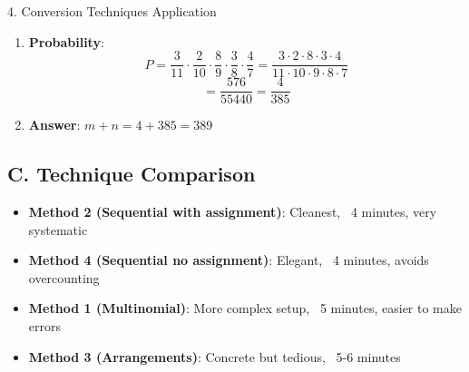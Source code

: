 \documentclass[12pt]{article}
\begin{document}
\begin{conversionbox}{4. Conversion Techniques Application}
\begin{enumerate}
    \item \textbf{Probability}:
    \[P = \frac{3}{11} \cdot \frac{2}{10} \cdot \frac{8}{9} \cdot \frac{3}{8} \cdot \frac{4}{7} = \frac{3 \cdot 2 \cdot 8 \cdot 3 \cdot 4}{11 \cdot 10 \cdot 9 \cdot 8 \cdot 7}\]
    \[= \frac{576}{55440} = \frac{4}{385}\]
    
    \item \textbf{Answer}: $m + n = 4 + 385 = 389$
\end{enumerate}

\subsection*{C. Technique Comparison}

\begin{itemize}
    \item \textbf{Method 2 (Sequential with assignment)}: Cleanest, ~4 minutes, very systematic
    \item \textbf{Method 4 (Sequential no assignment)}: Elegant, ~4 minutes, avoids overcounting
    \item \textbf{Method 1 (Multinomial)}: More complex setup, ~5 minutes, easier to make errors
    \item \textbf{Method 3 (Arrangements)}: Concrete but tedious, ~5-6 minutes
\end{itemize}

\end{conversionbox}
\end{document}
